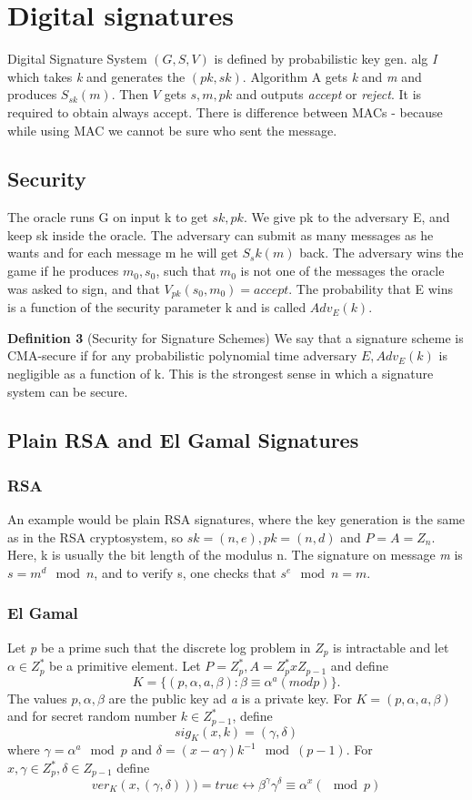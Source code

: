 \documentclass[a4paper,10pt]{article}
\begin{document}
\section*{Digital signatures}
Digital Signature System $(G, S, V)$ is defined by probabilistic key gen. alg \textit{I} which takes \textit{k} and generates the $(pk,sk)$. Algorithm A gets \textit{k} and \textit{m} and produces $S_{sk}(m)$. Then $V$ gets $s,m,pk$ and outputs \textit{accept} or \textit{reject}. It is required to obtain always accept.
There is difference between MACs - because while using MAC we cannot be sure who sent the message.

\subsection*{Security}
The oracle runs G on input k to get $sk,pk$. We give pk to the adversary E,
and keep sk inside the oracle. The adversary can submit as many messages
as he wants and for each message m he will get $S_sk(m)$ back.
The adversary wins the game if he produces $m_0,s_0$, such that $m_0$ is not one
of the messages the oracle was asked to sign, and that $V_{pk}(s_0,m_0) = accept$.
The probability that E wins is a function of the security parameter k and is
called $Adv_E(k)$.

\noindent
\textbf{Definition 3} (Security for Signature Schemes) We say that a signature scheme is CMA-secure if for any probabilistic polynomial time adversary $E, Adv_E(k)$ is negligible as a function of k. This is the strongest sense in which a signature system can be secure.

\subsection*{Plain RSA and El Gamal Signatures}
\subsubsection*{RSA}
An example would be plain RSA signatures, where the key generation
is the same as in the RSA cryptosystem, so $sk = (n,e),pk = (n,d)$ and
$P = A = Z_n$. Here, k is usually the bit length of the modulus n. The
signature on message \textit{m} is $s = m^d\mod n$, and to verify s, one checks that
$s^e\mod n = m$. 
\subsubsection*{El Gamal}
Let \textit{p} be a prime such that the discrete log problem in $Z_p$ is intractable and let $\alpha \in Z^{*}_p$ be a primitive element. Let $P = Z^{*}_p, A=Z_p^{*}xZ_{p-1}$ and define $$
K = \{ (p,\alpha,a,\beta) : \beta \equiv \alpha^a (mod p)\}.
$$
The values $p,\alpha,\beta$ are the public key ad \textit{a} is a private key. For $K=(p,\alpha,a,\beta)$ and for secret random number $k \in Z_{p-1}^{*}$, define
$$
sig_K(x,k) = (\gamma,\delta)
$$
where $\gamma = \alpha^a \mod p$ and $\delta = (x-a\gamma)k^{-1} \mod (p-1)$. For $x,\gamma \in Z_p^{*}, \delta \in Z_{p-1}$ define
$$
ver_K(x,(\gamma,\delta))) = true \leftrightarrow \beta^\gamma\gamma^\delta \equiv \alpha^x (\mod p)
$$
\end{document}
